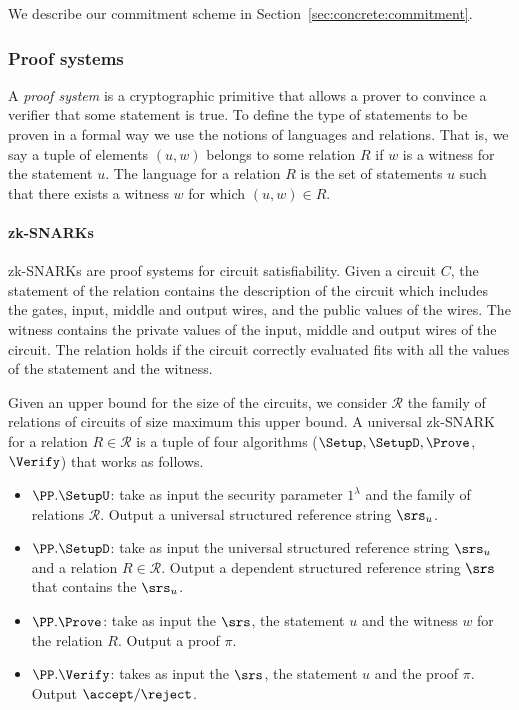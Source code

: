 We describe our commitment scheme in Section~\ref{sec:concrete:commitment}.

\subsubsection{Proof systems}

A \emph{proof system} is a cryptographic primitive that allows a prover to convince a verifier that some statement is true. To define the type of statements to be proven in a formal way we use the notions of languages and relations. That is, we say a tuple of elements $(u, w )$ belongs to some relation $R$ if $w$ is a witness for the statement $u$. The language for a relation $R$ is the set of statements $u$ such that there exists a witness $w$ for which $(u, w )\in R$. 

\paragraph{zk-SNARKs}

zk-SNARKs are proof systems for circuit satisfiability. Given a circuit $C$, the statement of the relation contains the description of the circuit which includes the gates, input, middle and output wires, and the public values of the wires. The witness contains the private values of the input, middle and output wires of the circuit. The relation holds if the circuit correctly evaluated fits with all the values of the statement and the witness. 

Given an upper bound for the size of the circuits, we consider $\mathcal{R}$ the family of relations of circuits of size maximum this upper bound. A universal zk-SNARK for a relation $R\in \mathcal{R}$ is a tuple of four algorithms ($\Setup, \SetupD, \Prove$, $\Verify$) that works as follows.
\begin{itemize}
	\item $\PP.\SetupU$: take as input the security parameter $1^\lambda$ and the family of relations $\mathcal{R}$. Output a universal structured reference string $\srs_u$.
	\item $\PP.\SetupD$: take as input the universal structured reference string $\srs_u$ and a relation $R\in \mathcal{R}$. Output a dependent structured reference string $\srs$ that contains the $\srs_u$.
	\item $\PP.\Prove$: take as input the $\srs$, the statement $u$ and the witness $w$ for the relation $R$. Output a proof $\pi$.
	\item $\PP.\Verify$: takes as input the $\srs$, the statement $u$ and the proof $\pi$. Output $\accept/ \reject$.
\end{itemize}

